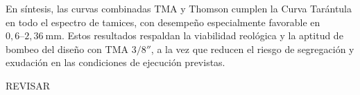 En síntesis, las curvas combinadas TMA y Thomson cumplen la Curva Tarántula en todo el espectro de tamices, con desempeño especialmente favorable en \(0{,}6\text{–}2{,}36~\mathrm{mm}\). Estos resultados respaldan la viabilidad reológica y la aptitud de bombeo del diseño con TMA \(3/8''\), a la vez que reducen el riesgo de segregación y exudación en las condiciones de ejecución previstas.


REVISAR


